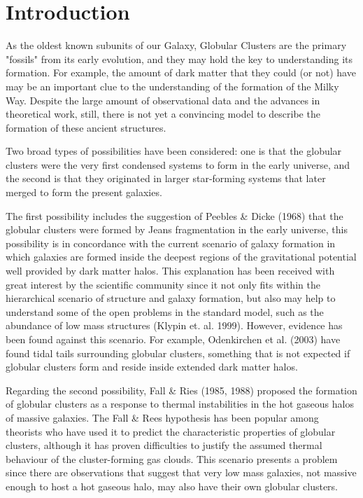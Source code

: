 \chapter{Introduction}

As the oldest known subunits of our Galaxy, Globular Clusters are the primary "fossils" from its early evolution, and they may hold the key to understanding its formation. For example, the amount of dark matter that they could (or not) have may be an important clue to the understanding of the formation of the Milky Way. Despite the large amount of observational data and the advances in theoretical work, still, there is not yet a convincing model to describe the formation of these ancient structures. 

Two broad types of possibilities have been considered: one is that the globular clusters were the very first condensed systems to form in the early universe, and the second is that they originated in larger star-forming systems that later merged to form the present galaxies. 

The first possibility includes the suggestion of Peebles \& Dicke (1968) that the globular clusters were formed by Jeans fragmentation in the early universe, this possibility is in concordance with the current scenario of galaxy formation in which galaxies are formed inside the deepest regions of the gravitational potential well provided by dark matter halos. This explanation has been received with great interest by the scientific community since it not only fits within the hierarchical scenario of structure and galaxy formation, but also may help to understand some of the open problems in the standard model, such as the abundance of low mass structures (Klypin et. al. 1999). However, evidence has been found against this scenario. For example, Odenkirchen et al. (2003) have found tidal tails surrounding globular clusters, something that is not expected if globular clusters form and reside inside extended dark matter halos.

Regarding the second possibility, Fall \& Ries (1985, 1988) proposed the formation of globular clusters as a response to thermal instabilities in the hot gaseous halos of massive galaxies. The Fall \& Rees hypothesis has been popular among theorists who have used it to predict the characteristic properties of globular clusters, although it has proven difficulties to justify the assumed thermal behaviour of the cluster-forming gas clouds. This scenario presents a problem since there are observations that suggest that very low mass galaxies, not massive enough to host a hot gaseous halo, may also have their own globular clusters.

